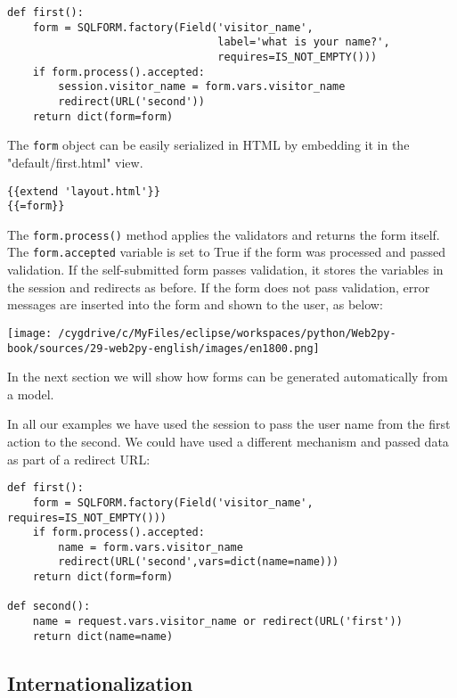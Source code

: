 \documentclass[justified,sixbynine,notoc]{tufte-book}
\def\ft{\small\tt}
\begin{document}
\begin{fullwidth}
\begin{lstlisting}
def first():
    form = SQLFORM.factory(Field('visitor_name',
                                 label='what is your name?',
                                 requires=IS_NOT_EMPTY()))
    if form.process().accepted:
        session.visitor_name = form.vars.visitor_name
        redirect(URL('second'))
    return dict(form=form)
\end{lstlisting}

The {\ft form} object can be easily serialized in HTML by embedding it in the "default/first.html" view.
\begin{lstlisting}[keywords={}]
{{extend 'layout.html'}}
{{=form}}
\end{lstlisting}

The {\ft form.process()} method applies the validators and returns the form itself. The {\ft form.accepted} variable is set to True if the form was processed and passed validation. If the self-submitted form passes validation, it stores the variables in the session and redirects as before. If the form does not pass validation, error messages are inserted into the form and shown to the user, as below:


\goodbreak\begin{center}\texttt{[image: /cygdrive/c/MyFiles/eclipse/workspaces/python/Web2py-book/sources/29-web2py-english/images/en1800.png]}\end{center}


In the next section we will show how forms can be generated automatically from a model.

In all our examples we have used the session to pass the user name from the first action to the second. We could have used a different mechanism and passed data as part of a redirect URL:

\begin{lstlisting}
def first():
    form = SQLFORM.factory(Field('visitor_name', requires=IS_NOT_EMPTY()))
    if form.process().accepted:
        name = form.vars.visitor_name
        redirect(URL('second',vars=dict(name=name)))
    return dict(form=form)

def second():
    name = request.vars.visitor_name or redirect(URL('first'))
    return dict(name=name)
\end{lstlisting}

\goodbreak\subsection{Internationalization}


\end{fullwidth}
\end{document}
